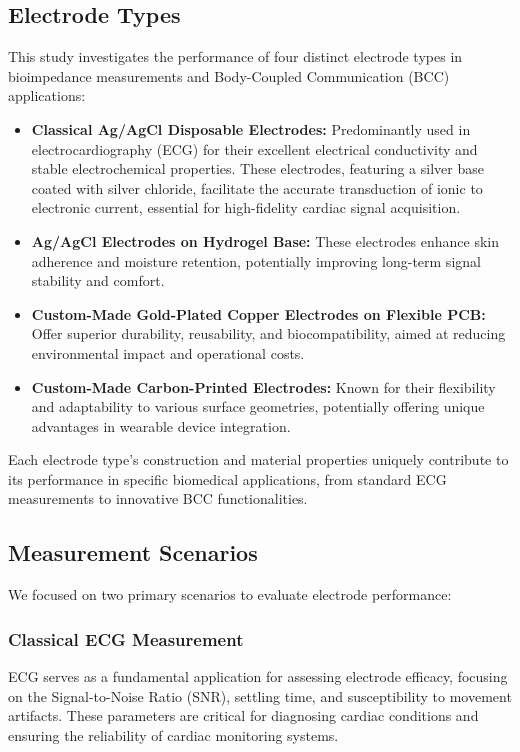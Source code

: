 \documentclass[conference]{IEEEtran}
\begin{document}
\subsection{Electrode Types}
This study investigates the performance of four distinct electrode types in bioimpedance measurements and Body-Coupled Communication (BCC) applications:
\begin{itemize}
    \item \textbf{Classical Ag/AgCl Disposable Electrodes:} Predominantly used in electrocardiography (ECG) for their excellent electrical conductivity and stable electrochemical properties. These electrodes, featuring a silver base coated with silver chloride, facilitate the accurate transduction of ionic to electronic current, essential for high-fidelity cardiac signal acquisition.
    
    \item \textbf{Ag/AgCl Electrodes on Hydrogel Base:} These electrodes enhance skin adherence and moisture retention, potentially improving long-term signal stability and comfort.
    
    \item \textbf{Custom-Made Gold-Plated Copper Electrodes on Flexible PCB:} Offer superior durability, reusability, and biocompatibility, aimed at reducing environmental impact and operational costs.
    
    \item \textbf{Custom-Made Carbon-Printed Electrodes:} Known for their flexibility and adaptability to various surface geometries, potentially offering unique advantages in wearable device integration.
\end{itemize}

Each electrode type's construction and material properties uniquely contribute to its performance in specific biomedical applications, from standard ECG measurements to innovative BCC functionalities. 

\subsection{Measurement Scenarios}
We focused on two primary scenarios to evaluate electrode performance:

\subsubsection{Classical ECG Measurement}
ECG serves as a fundamental application for assessing electrode efficacy, focusing on the Signal-to-Noise Ratio (SNR), settling time, and susceptibility to movement artifacts. These parameters are critical for diagnosing cardiac conditions and ensuring the reliability of cardiac monitoring systems.
\end{document}
